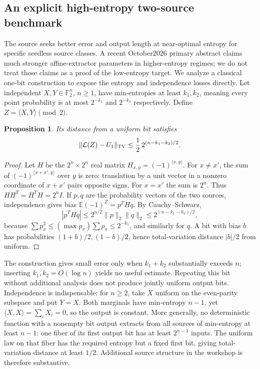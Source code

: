 \documentclass[11pt]{article}
\newtheorem{proposition}{Proposition}
\begin{document}
\subsection{An explicit high-entropy two-source benchmark}
The source seeks better error and output length at near-optimal entropy for specific seedless source classes. A recent October2026 primary abstract claims much stronger affine-extractor parameters in higher-entropy regimes; we do not treat those claims as a proof of the low-entropy target. We analyze a classical one-bit construction to expose the entropy and independence losses directly.
Let independent $X,Y\in\mathbb F_2^n$, $n\ge1$, have min-entropies at least $k_1,k_2$, meaning every point probability is at most $2^{-k_1}$ and $2^{-k_2}$ respectively. Define $Z=\langle X,Y\rangle\pmod2$.
\begin{proposition}
Its distance from a uniform bit satisfies
\[
\|\mathcal L(Z)-U_1\|_{\rm TV}
\le\frac12\,2^{(n-k_1-k_2)/2}.
\]
\end{proposition}
\begin{proof}
Let $H$ be the $2^n\times2^n$ real matrix $H_{x,y}=(-1)^{\langle x,y\rangle}$. For $x\ne x'$, the sum of $(-1)^{\langle x+x',y\rangle}$ over $y$ is zero: translation by a unit vector in a nonzero coordinate of $x+x'$ pairs opposite signs. For $x=x'$ the sum is $2^n$. Thus $HH^T=H^TH=2^nI$. If $p,q$ are the probability vectors of the two sources, independence gives bias $\mathbb E(-1)^Z=p^THq$. By Cauchy--Schwarz,
\[
|p^THq|\le2^{n/2}\|p\|_2\|q\|_2
\le2^{(n-k_1-k_2)/2},
\]
because $\sum p_x^2\le(\max p_x)\sum p_x\le2^{-k_1}$, and similarly for $q$. A bit with bias $b$ has probabilities $(1+b)/2,(1-b)/2$, hence total-variation distance $|b|/2$ from uniform.
\end{proof}
The construction gives small error only when $k_1+k_2$ substantially exceeds $n$; inserting $k_1,k_2=O(\log n)$ yields no useful estimate. Repeating this bit without additional analysis does not produce jointly uniform output bits.
Independence is indispensable: for $n\ge2$, take $X$ uniform on the even-parity subspace and put $Y=X$. Both marginals have min-entropy $n-1$, yet $\langle X,X\rangle=\sum_iX_i=0$, so the output is constant. More generally, no deterministic function with a nonempty bit output extracts from all sources of min-entropy at least $n-1$: one fiber of its first output bit has at least $2^{n-1}$ inputs. The uniform law on that fiber has the required entropy but a fixed first bit, giving total-variation distance at least $1/2$. Additional source structure in the workshop is therefore substantive.
\end{document}
